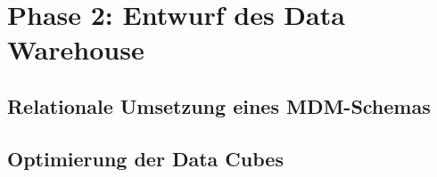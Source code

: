 \section{Phase 2: Entwurf des Data Warehouse}

\subsection{Relationale Umsetzung eines MDM-Schemas}
\label{ref:mdmSchema}

\subsection{Optimierung der Data Cubes}
\label{ref:optimierung}